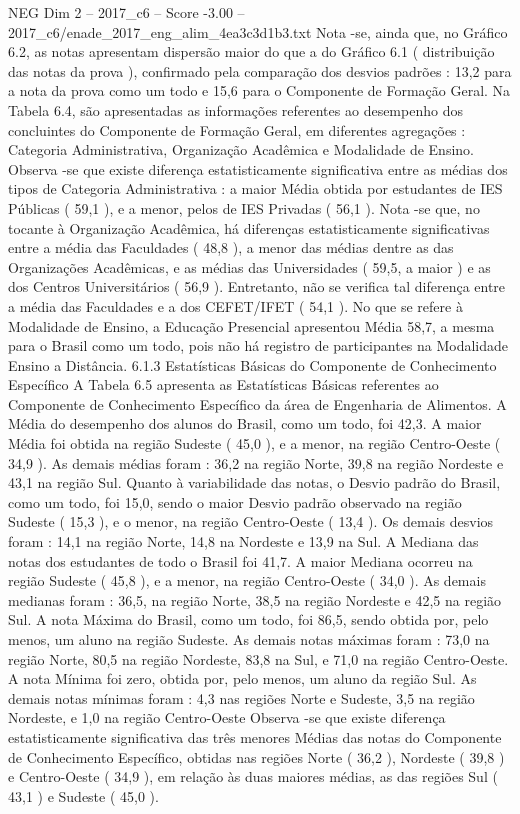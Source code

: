 \begin{textsample}{NEG Dim 2 – 2017\_c6 – Score -3.00 – 2017\_c6/enade\_2017\_eng\_alim\_4ea3c3d1b3.txt}
Nota -se, ainda que, no Gráfico 6.2, as notas apresentam dispersão maior do que a do Gráfico 6.1 ( distribuição das notas da prova ), confirmado pela comparação dos desvios padrões : 13,2 para a nota da prova como um todo e 15,6 para o Componente de Formação Geral.
Na Tabela 6.4, são apresentadas as informações referentes ao desempenho dos concluintes do Componente de Formação Geral, em diferentes agregações : Categoria Administrativa, Organização Acadêmica e Modalidade de Ensino.
Observa -se que existe diferença estatisticamente significativa entre as médias dos tipos de Categoria Administrativa : a maior Média obtida por estudantes de IES Públicas ( 59,1 ), e a menor, pelos de IES Privadas ( 56,1 ).
Nota -se que, no tocante à Organização Acadêmica, há diferenças estatisticamente significativas entre a média das Faculdades ( 48,8 ), a menor das médias dentre as das Organizações Acadêmicas, e as médias das Universidades ( 59,5, a maior ) e as dos Centros Universitários ( 56,9 ).
Entretanto, não se verifica tal diferença entre a média das Faculdades e a dos CEFET/IFET ( 54,1 ).
No que se refere à Modalidade de Ensino, a Educação Presencial apresentou Média 58,7, a mesma para o Brasil como um todo, pois não há registro de participantes na Modalidade Ensino a Distância. 6.1.3 Estatísticas Básicas do Componente de Conhecimento Específico A Tabela 6.5 apresenta as Estatísticas Básicas referentes ao Componente de Conhecimento Específico da área de Engenharia de Alimentos.
A Média do desempenho dos alunos do Brasil, como um todo, foi 42,3.
A maior Média foi obtida na região Sudeste ( 45,0 ), e a menor, na região Centro-Oeste ( 34,9 ).
As demais médias foram : 36,2 na região Norte, 39,8 na região Nordeste e 43,1 na região Sul.
Quanto à variabilidade das notas, o Desvio padrão do Brasil, como um todo, foi 15,0, sendo o maior Desvio padrão observado na região Sudeste ( 15,3 ), e o menor, na região Centro-Oeste ( 13,4 ).
Os demais desvios foram : 14,1 na região Norte, 14,8 na Nordeste e 13,9 na Sul.
A Mediana das notas dos estudantes de todo o Brasil foi 41,7.
A maior Mediana ocorreu na região Sudeste ( 45,8 ), e a menor, na região Centro-Oeste ( 34,0 ).
As demais medianas foram : 36,5, na região Norte, 38,5 na região Nordeste e 42,5 na região Sul.
A nota Máxima do Brasil, como um todo, foi 86,5, sendo obtida por, pelo menos, um aluno na região Sudeste.
As demais notas máximas foram : 73,0 na região Norte, 80,5 na região Nordeste, 83,8 na Sul, e 71,0 na região Centro-Oeste.
A nota Mínima foi zero, obtida por, pelo menos, um aluno da região Sul.
As demais notas mínimas foram : 4,3 nas regiões Norte e Sudeste, 3,5 na região Nordeste, e 1,0 na região Centro-Oeste Observa -se que existe diferença estatisticamente significativa das três menores Médias das notas do Componente de Conhecimento Específico, obtidas nas regiões Norte ( 36,2 ), Nordeste ( 39,8 ) e Centro-Oeste ( 34,9 ), em relação às duas maiores médias, as das regiões Sul ( 43,1 ) e Sudeste ( 45,0 ).

\end{textsample}
